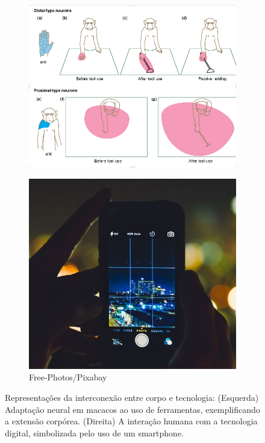 \begin{figure}[ht]
	\centering
	\begin{subfigure}{0.45\textwidth}
		\includegraphics[width=\linewidth]{images/tools_for_the_body.png}
        \caption*{}
	\end{subfigure}
	\hfill
	\begin{subfigure}{0.45\textwidth}
		\includegraphics[width=\linewidth]{images/tools_for_the_mind.jpg}
		\caption*{Free-Photos/Pixabay}
	\end{subfigure}
	\caption{Representações da interconexão entre corpo e tecnologia: (Esquerda) Adaptação neural em macacos ao uso de ferramentas, exemplificando a extensão corpórea. (Direita) A interação humana com a tecnologia digital, simbolizada pelo uso de um smartphone.}
	\label{fig:corpo_tecnologia}
\end{figure}

